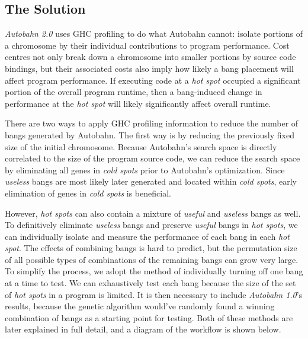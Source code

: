 \documentclass[format=sigplan]{acmart}
\newcommand{\hotspot}[0]{\textit{hot spot}}
\newcommand{\hotspots}[0]{\textit{hot spots}}
\newcommand{\coldspots}[0]{\textit{cold spots}}
\newcommand{\useful}[0]{\textit{useful}}
\newcommand{\useless}[0]{\textit{useless}}
\newcommand{\Ao}[0]{\textit{Autobahn 1.0}}
\newcommand{\At}[0]{\textit{Autobahn 2.0}}
\begin{document}
\subsection{The Solution}

\At{} uses GHC profiling to do what Autobahn cannot: isolate portions of a chromosome by their individual contributions to program performance. Cost centres not only break down a chromosome into smaller portions by source code bindings, but their associated costs also imply how likely a bang placement will affect program performance. If executing code at a \hotspot{} occupied a significant portion of the overall program runtime, then a bang-induced change in performance at the \hotspot{} will likely significantly affect overall runtime. 

There are two ways to apply GHC profiling information to reduce the number of bangs generated by Autobahn. The first way is by reducing the previously fixed size of the initial chromosome. Because Autobahn's search space is directly correlated to the size of the program source code, we can reduce the search space by eliminating all genes in \coldspots{} prior to Autobahn's optimization. Since \useless{} bangs are most likely later generated and located within \coldspots{}, early elimination of genes in \coldspots{} is beneficial. 

However, \hotspots{} can also contain a mixture of \useful{} and \useless{} bangs as well. To definitively eliminate \useless{} bangs and preserve \useful{} bangs in \hotspots{}, we can individually isolate and measure the performance of each bang in each \hotspot{}. The effects of combining bangs is hard to predict, but the permutation size of all possible types of combinations of the remaining bangs can grow very large. To simplify the process, we adopt the method of individually turning off one bang at a time to test. We can exhaustively test each bang because the size of the set of \hotspots{} in a program is limited. It is then necessary to include \Ao{}'s results, because the genetic algorithm would've randomly found a winning combination of bangs as a starting point for testing. Both of these methods are later explained in full detail, and a diagram of the workflow is shown below.

\end{document}
